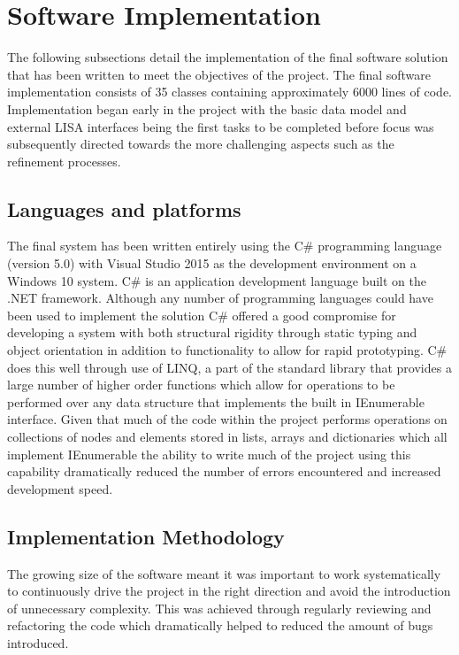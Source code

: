 \section{Software Implementation}
The following subsections detail the implementation of the final software solution that has been written to meet the objectives of the project. The final software implementation consists of 35 classes containing approximately 6000 lines of code. Implementation began early in the project with the basic data model and external LISA interfaces being the first tasks to be completed before focus was subsequently directed towards the more challenging aspects such as the refinement processes.

\subsection{Languages and platforms}
The final system has been written entirely using the C\# programming language (version 5.0) with Visual Studio 2015 as the development environment on a Windows 10 system. C\# is an application development language built on the .NET framework. Although any number of programming languages could have been used to implement the solution C\# offered a good compromise for developing a system with both structural rigidity through static typing and object orientation in addition to functionality to allow for rapid prototyping. C\# does this well through use of LINQ, a part of the standard library that provides a large number of higher order functions which allow for operations to be performed over any data structure that implements the built in IEnumerable interface. Given that much of the code within the project performs operations on collections of nodes and elements stored in lists, arrays and dictionaries which all implement IEnumerable the ability to write much of the project using this capability dramatically reduced the number of errors encountered and increased development speed.


\subsection{Implementation Methodology}
The growing size of the software meant it was important to work systematically to continuously drive the project in the right direction and avoid the introduction of unnecessary complexity. This was achieved through regularly reviewing and refactoring the code which dramatically helped to reduced the amount of bugs introduced. \\

